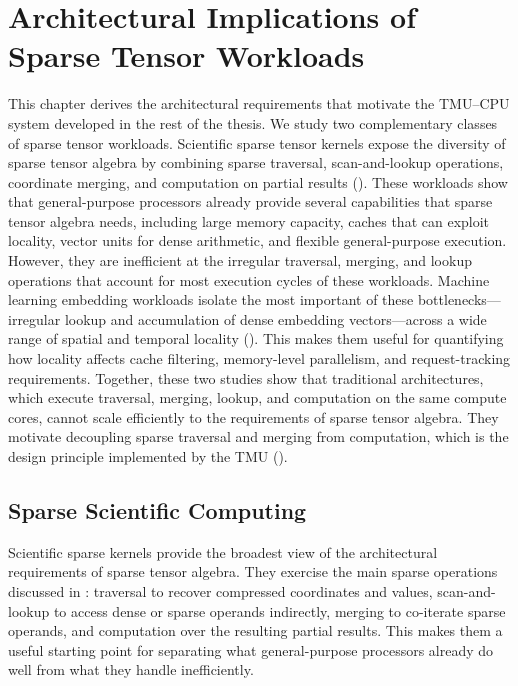 \chapter{Architectural Implications of Sparse Tensor Workloads} \label{sec:architectural-implications}

This chapter derives the architectural requirements that motivate the TMU--CPU system developed in the rest of the thesis. We study two complementary classes of sparse tensor workloads. Scientific sparse tensor kernels expose the diversity of sparse tensor algebra by combining sparse traversal, scan-and-lookup operations, coordinate merging, and computation on partial results (). These workloads show that general-purpose processors already provide several capabilities that sparse tensor algebra needs, including large memory capacity, caches that can exploit locality, vector units for dense arithmetic, and flexible general-purpose execution. However, they are inefficient at the irregular traversal, merging, and lookup operations that account for most execution cycles of these workloads. Machine learning embedding workloads isolate the most important of these bottlenecks---irregular lookup and accumulation of dense embedding vectors---across a wide range of spatial and temporal locality (). This makes them useful for quantifying how locality affects cache filtering, memory-level parallelism, and request-tracking requirements. Together, these two studies show that traditional architectures, which execute traversal, merging, lookup, and computation on the same compute cores, cannot scale efficiently to the requirements of sparse tensor algebra. They motivate decoupling sparse traversal and merging from computation, which is the design principle implemented by the TMU ().

\section{Sparse Scientific Computing} \label{sec:sparse-scientific-computing} %

Scientific sparse kernels provide the broadest view of the architectural requirements of sparse tensor algebra. They exercise the main sparse operations discussed in : traversal to recover compressed coordinates and values, scan-and-lookup to access dense or sparse operands indirectly, merging to co-iterate sparse operands, and computation over the resulting partial results. This makes them a useful starting point for separating what general-purpose processors already do well from what they handle inefficiently.

